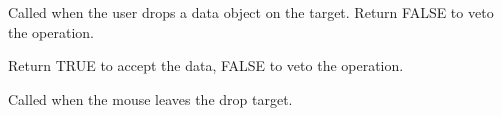 Called when the user drops a data object on the target. Return FALSE to veto the operation.







Return TRUE to accept the data, FALSE to veto the operation.

\label{wxdroptargetonleave}


Called when the mouse leaves the drop target.

